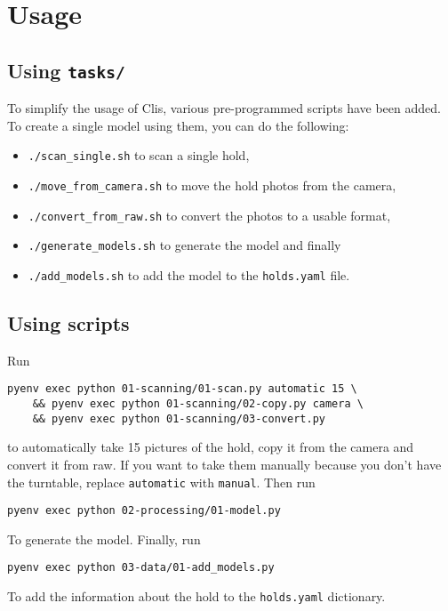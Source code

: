\section{Usage}

\subsection{Using \texttt{tasks/}}

To simplify the usage of Clis, various pre-programmed scripts have been added.
To create a single model using them, you can do the following:

\begin{itemize}
	\item \texttt{./scan_single.sh} to scan a single hold,
	\item \texttt{./move_from_camera.sh} to move the hold photos from the camera,
	\item \texttt{./convert_from_raw.sh} to convert the photos to a usable format,
	\item \texttt{./generate_models.sh} to generate the model and finally
	\item \texttt{./add_models.sh} to add the model to the \texttt{holds.yaml} file.
\end{itemize}

\subsection{Using scripts}

Run

\begin{verbatim}
pyenv exec python 01-scanning/01-scan.py automatic 15 \
	&& pyenv exec python 01-scanning/02-copy.py camera \
	&& pyenv exec python 01-scanning/03-convert.py
\end{verbatim}

to automatically take 15 pictures of the hold, copy it from the camera
and convert it from raw. If you want to take them manually because you
don't have the turntable, replace \texttt{automatic} with
\texttt{manual}. Then run

\begin{verbatim}
pyenv exec python 02-processing/01-model.py
\end{verbatim}

To generate the model. Finally, run

\begin{verbatim}
pyenv exec python 03-data/01-add_models.py
\end{verbatim}

To add the information about the hold to the \texttt{holds.yaml}
dictionary.
